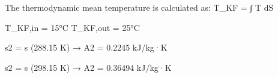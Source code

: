 The thermodynamic mean temperature is calculated as:  
T_KF = ∫ T dS  

T_KF,in = 15°C  
T_KF,out = 25°C  

s2 = s (288.15 K) → A2  
= 0.2245 kJ/kg·K  

s2 = s (298.15 K) → A2  
= 0.36494 kJ/kg·K